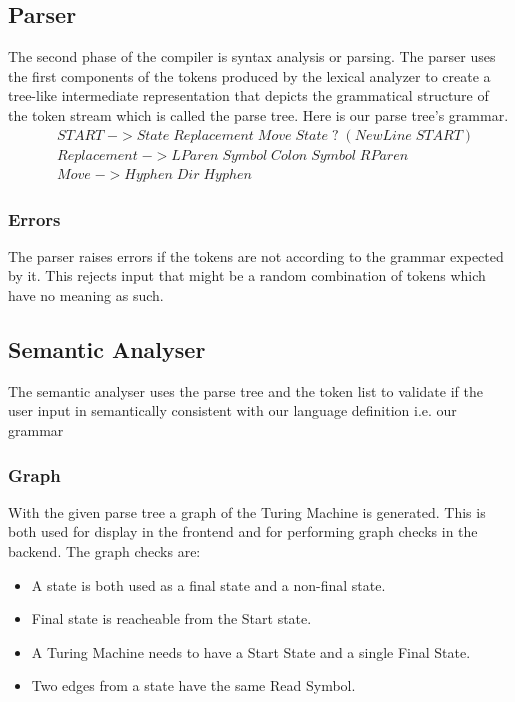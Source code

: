 \documentclass[12pt]{report}
\begin{document}
\subsection{Parser}
The second phase of the compiler is syntax analysis or parsing. The parser uses the first components of the tokens produced by the lexical analyzer to create a tree-like intermediate representation that depicts the grammatical structure of the token stream which is called the parse tree. Here is our parse tree's grammar.
\begin{align*}
&START \; -> State \; Replacement \; Move \;  State \; ?  \; ( NewLine \; START ) \\
&Replacement \; ->  LParen \; Symbol \; Colon \; Symbol \; RParen \\
&Move \; -> Hyphen \; Dir \; Hyphen
\end{align*}
\subsubsection{Errors}
The parser raises errors if the tokens are not according to the grammar expected by it. This rejects input that might be a random combination of tokens which have no meaning as such.

\subsection{Semantic Analyser}
The semantic analyser uses the parse tree and the token list to validate if the user input in semantically consistent with our language definition i.e. our grammar
\subsubsection{Graph}
With the given parse tree a graph of the Turing Machine is generated. This is both used for display in the frontend and for performing graph checks in the backend. The graph checks are:
\begin{itemize}
    \item A state is both used as a final state and a non-final state.
    \item Final state is reacheable from the Start state.
    \item A Turing Machine needs to have a Start State and a single Final State.
    \item Two edges from a state have the same Read Symbol.
\end{itemize}
\end{document}
